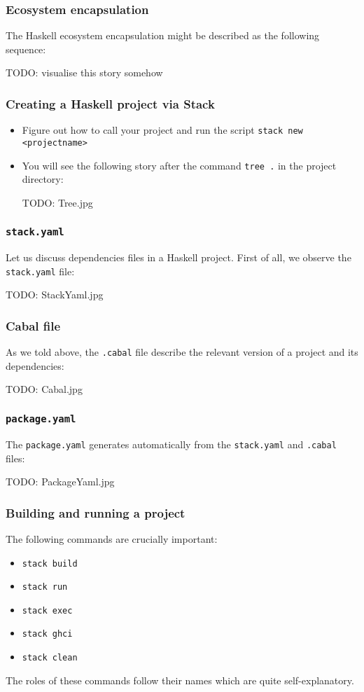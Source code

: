 \documentclass[10pt,pdf,utf8,russian,aspectratio=169]{beamer}
\begin{document}
\begin{frame}
  \frametitle{Ecosystem encapsulation}

  The Haskell ecosystem encapsulation might be described as the following sequence:

  TODO: visualise this story somehow
\end{frame}

\begin{frame}
  \frametitle{Creating a Haskell project via Stack}
  \begin{itemize}
    \item Figure out how to call your project and run the script \verb"stack new <projectname>"
    \item You will see the following story after the command \verb"tree ." in the project directory:

    TODO: Tree.jpg
  \end{itemize}
\end{frame}

\begin{frame}
  \frametitle{\verb"stack.yaml"}

  Let us discuss dependencies files in a Haskell project. First of all, we observe the \verb"stack.yaml" file:

  TODO: StackYaml.jpg
\end{frame}

\begin{frame}
  \frametitle{Cabal file}

  As we told above, the \verb".cabal" file describe the relevant version of a project and its dependencies:

  TODO: Cabal.jpg
\end{frame}

\begin{frame}
  \frametitle{\verb"package.yaml"}

  The \verb"package.yaml" generates automatically from the \verb"stack.yaml" and \verb".cabal" files:

  TODO: PackageYaml.jpg
\end{frame}

\begin{frame}
  \frametitle{Building and running a project}

The following commands are crucially important:

  \begin{itemize}
    \item \verb"stack build"
    \item \verb"stack run"
    \item \verb"stack exec"
    \item \verb"stack ghci"
    \item \verb"stack clean"
  \end{itemize}

  The roles of these commands follow their names which are quite self-explanatory.
\end{frame}
\end{document}
